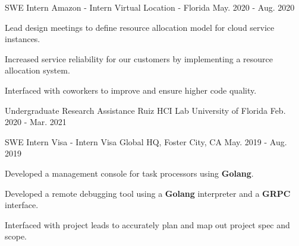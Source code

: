 


\begin{cventries}

	
		\cventry
	{SWE Intern} %
	{Amazon - Intern} %
	{Virtual Location - Florida} %
	{May. 2020 - Aug. 2020} %
	{ %
		\begin{cvitems}
			\setlength{\itemindent}{.125in}
			\item {Lead design meetings to define resource allocation model for cloud service instances.}
			\item {Increased service reliability for our customers by implementing a resource allocation system. }
			\item {Interfaced with coworkers to improve and ensure higher code quality.}
		\end{cvitems}
	}
	
	
			\cventry
	{Undergraduate Research Assistance} %
	{Ruiz HCI Lab} %
	{University of Florida} %
	{Feb. 2020 - Mar. 2021} %
	{ %
		\begin{cvitems}
			\setlength{\itemindent}{.125in}
			\item {}
			\item {}
			\item {}
		\end{cvitems}
	}
	
	
	\cventry
	{SWE Intern} %
	{Visa - Intern} %
	{Visa Global HQ, Foster City, CA} %
	{May. 2019 - Aug. 2019} %
	{ %
		\begin{cvitems}
			\setlength{\itemindent}{.125in}
			\item {Developed a management console for task processors using \textbf{Golang}.}
			\item {Developed a remote debugging tool using a \textbf{Golang} interpreter and a \textbf{GRPC} interface.}
			\item {Interfaced with project leads to accurately plan and map out project spec and scope.}
		\end{cvitems}
	}
	

\end{cventries}
